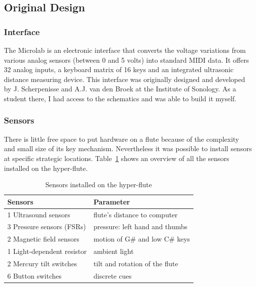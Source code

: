 \subsection{Original Design} 

\subsubsection{Interface}
The Microlab is an electronic interface that converts the voltage variations from various analog sensors (between 0 and 5 volts) into standard MIDI data.  It offers 32 analog inputs, a keyboard matrix of 16 keys and an integrated ultrasonic distance measuring device. This interface was originally designed and developed by J. Scherpenisse and A.J. van den Broek at the Institute of Sonology. As a student there, I had access to the schematics and was able to build it myself.

\subsubsection{Sensors}

There is little free space to put hardware on a flute because of the complexity and small size of its key mechanism. Nevertheless it was possible to install sensors at specific strategic locations. Table~\ref{Palacio-Quintin:sensors-table} shows an overview of all the sensors installed on the hyper-flute.


\begin{table}[t]
\label{Palacio-Quintin:sensors-table}
\centering
{}
\caption{Sensors installed on the hyper-flute}
\vspace{3pt} \noindent
\begin{tabular}{ll}
\toprule
\textbf{Sensors}     & \textbf{Parameter}  \\
\midrule  
1 Ultrasound sensors & flute's distance to computer\\
3 Pressure sensors (FSRs) & pressure: left hand and thumbs\\
2 Magnetic field sensors &  motion of G\# and low C\# keys\\
1 Light-dependent resistor & ambient light\\
2 Mercury tilt switches & tilt and rotation of the flute \\
6 Button switches & discrete cues \\
\bottomrule
\end{tabular}
\end{table}

